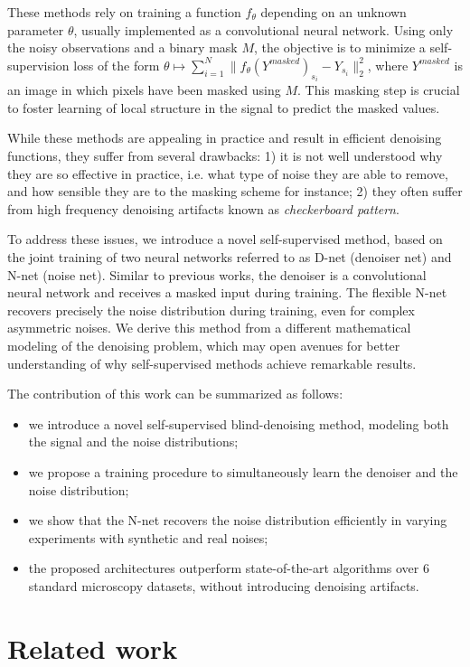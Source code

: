 \documentclass[lettersize,journal]{IEEEtran}
\begin{document}
These methods rely on training a function $f_\theta$ depending on an unknown parameter $\theta$, usually implemented as a convolutional neural network. Using only the noisy observations and a binary mask $M$, the objective is to minimize a self-supervision loss of the form $\theta\mapsto \sum_{i=1}^N \|f_\theta(Y^{masked})_{s_i} - Y_{s_i}\|_2^2$,
where $Y^{masked}$ is an image in which pixels have been masked using $M$. This masking step is crucial to foster learning of local structure in the signal to predict the masked values.

While these methods are appealing in practice and result in efficient denoising functions, they suffer from several drawbacks:
1) it is not well understood why they are so effective in practice, i.e. what type of noise they are able to remove, and how sensible they are to the masking scheme for instance;
2) they often suffer from high frequency denoising artifacts known as \textit{checkerboard pattern}.

To address these issues, we introduce a novel self-supervised method, based on the joint training of two neural networks referred to as D-net (denoiser net) and N-net (noise net). Similar to previous works, the denoiser is a convolutional neural network and receives a masked input during training. The flexible N-net recovers precisely the noise distribution during training, even for complex asymmetric noises.
We derive this method from a different mathematical modeling of the denoising problem, which may open avenues for better understanding of why self-supervised methods achieve remarkable results.

The contribution of this work can be summarized as follows:
\begin{itemize}
\item we introduce a novel self-supervised blind-denoising method, modeling both the signal and the noise distributions;
\item we propose a training procedure to simultaneously learn the denoiser and the noise distribution;
\item we show that the N-net recovers the noise distribution efficiently in varying experiments with synthetic and real noises;
\item the proposed architectures outperform state-of-the-art algorithms over 6 standard microscopy datasets, without introducing denoising artifacts.
\end{itemize}

\section{Related work}
\label{sec:related}
\end{document}

